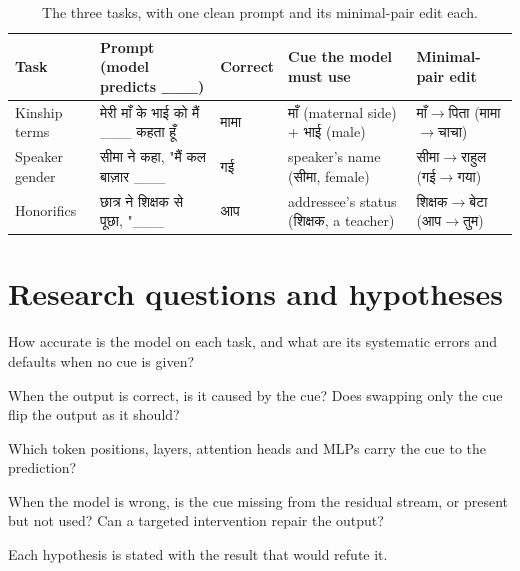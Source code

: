 \documentclass[11pt,a4paper]{article}
\newcommand{\hi}[1]{{\devfont #1}}
\begin{document}
\begin{table}[H]
\centering
\small
\begin{tabularx}{\textwidth}{@{}l Y l Y l@{}}
\toprule
\textbf{Task} & \textbf{Prompt (model predicts \_\_\_)} & \textbf{Correct} & \textbf{Cue the model must use} & \textbf{Minimal-pair edit} \\
\midrule
Kinship terms & \hi{मेरी माँ के भाई को मैं \_\_\_ कहता हूँ} & \hi{मामा} & \hi{माँ} (maternal side) + \hi{भाई} (male) & \hi{माँ}$\to$\hi{पिता} (\hi{मामा}$\to$\hi{चाचा}) \\[2pt]
Speaker gender & \hi{सीमा ने कहा, "मैं कल बाज़ार \_\_\_} & \hi{गई} & speaker's name (\hi{सीमा}, female) & \hi{सीमा}$\to$\hi{राहुल} (\hi{गई}$\to$\hi{गया}) \\[2pt]
Honorifics & \hi{छात्र ने शिक्षक से पूछा, "\_\_\_} & \hi{आप} & addressee's status (\hi{शिक्षक}, a teacher) & \hi{शिक्षक}$\to$\hi{बेटा} (\hi{आप}$\to$\hi{तुम}) \\
\bottomrule
\end{tabularx}
\caption{The three tasks, with one clean prompt and its minimal-pair edit each.}
\label{tab:tasks}
\end{table}

\section{Research questions and hypotheses}

\begin{description}[leftmargin=0pt,itemsep=0.25em]
  \item[RQ1 -- Behaviour.] How accurate is the model on each task, and what are its systematic errors and defaults when no cue is given?
  \item[RQ2 -- Context vs prior.] When the output is correct, is it caused by the cue? Does swapping only the cue flip the output as it should?
  \item[RQ3 -- Localisation.] Which token positions, layers, attention heads and MLPs carry the cue to the prediction?
  \item[RQ4 -- Failure diagnosis.] When the model is wrong, is the cue missing from the residual stream, or present but not used? Can a targeted intervention repair the output?
\end{description}

Each hypothesis is stated with the result that would refute it.
\end{document}
